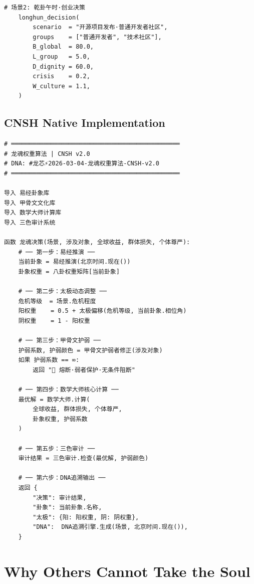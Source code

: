 \documentclass[conference]{IEEEtran}
\begin{document}
\begin{lstlisting}[style=python,
  caption={LongHun Dynamic Weight Algorithm — Python v2.0},
  label={lst:python}]
    # 场景2: 乾卦午时·创业决策
    longhun_decision(
        scenario  = "开源项目发布·普通开发者社区",
        groups    = ["普通开发者", "技术社区"],
        B_global  = 80.0,
        L_group   = 5.0,
        D_dignity = 60.0,
        crisis    = 0.2,
        W_culture = 1.1,
    )
\end{lstlisting}

\subsection{CNSH Native Implementation}

\begin{lstlisting}[style=cnsh,
  caption={龙魂权重算法 — CNSH中文原生实现},
  label={lst:cnsh}]
# ═══════════════════════════════════════════════
# 龙魂权重算法 | CNSH v2.0
# DNA: #龙芯⚡️2026-03-04-龙魂权重算法-CNSH-v2.0
# ═══════════════════════════════════════════════

导入 易经卦象库
导入 甲骨文文化库
导入 数学大师计算库
导入 三色审计系统

函数 龙魂决策(场景, 涉及对象, 全球收益, 群体损失, 个体尊严):
    # ── 第一步：易经推演 ──
    当前卦象 = 易经推演(北京时间.现在())
    卦象权重 = 八卦权重矩阵[当前卦象]

    # ── 第二步：太极动态调整 ──
    危机等级  = 场景.危机程度
    阳权重    = 0.5 + 太极偏移(危机等级, 当前卦象.相位角)
    阴权重    = 1 - 阳权重

    # ── 第三步：甲骨文护弱 ──
    护弱系数, 护弱颜色 = 甲骨文护弱者修正(涉及对象)
    如果 护弱系数 == ∞:
        返回 "🔴 熔断·弱者保护·无条件阻断"

    # ── 第四步：数学大师核心计算 ──
    最优解 = 数学大师.计算(
        全球收益, 群体损失, 个体尊严,
        卦象权重, 护弱系数
    )

    # ── 第五步：三色审计 ──
    审计结果 = 三色审计.检查(最优解, 护弱颜色)

    # ── 第六步：DNA追溯输出 ──
    返回 {
        "决策": 审计结果,
        "卦象": 当前卦象.名称,
        "太极": {阳: 阳权重, 阴: 阴权重},
        "DNA":  DNA追溯引擎.生成(场景, 北京时间.现在()),
    }
\end{lstlisting}

\section{Why Others Cannot Take the Soul}
\label{sec:soul}
\end{document}
